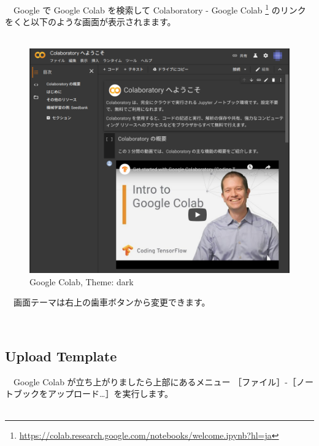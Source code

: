 \documentclass[
  12pt,
]{book}
\DeclareRobustCommand{\href}[2]{#2\footnote{\url{#1}}}
\begin{document}
　Google で Google Colab を検索して \href{https://colab.research.google.com/notebooks/welcome.ipynb?hl=ja}{Colaboratory - Google Colab } のリンクをくと以下のような画面が表示されまます。\\
　

\begin{figure}[H]

{\centering \includegraphics[width=0.8\linewidth,]{fig/Colab/welcome} 

}

\caption{Google Colab, Theme: dark}\label{fig:unnamed-chunk-77}
\end{figure}

　画面テーマは右上の歯車ボタンから変更できます。

　

\hypertarget{upload-template}{%
\subsection{Upload Template}\label{upload-template}}

　Google Colab が立ち上がりましたら上部にあるメニュー ［ファイル］-［ノートブックをアップロード\ldots］を実行します。\\
　
\end{document}
